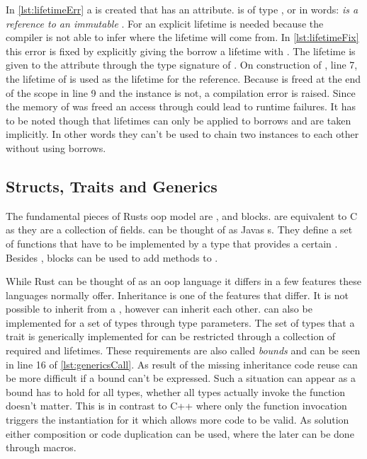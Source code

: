 \documentclass[thesis]{subfiles}
\begin{document}
    In \autoref{lst:lifetimeErr} a \struct \Foo is created that has an attribute.
     is of type , or in words: \emph{ is a reference to an immutable \String}.
    For  an explicit lifetime is needed because the compiler is not able to infer where the lifetime will come from.
    In \autoref{lst:lifetimeFix} this error is fixed by explicitly giving the borrow a lifetime with .
    The lifetime is given to the attribute through the type signature of \Foo.
    On construction of \Foo, line 7, the lifetime of  is used as the lifetime for the reference.
    Because  is freed at the end of the scope in line 9 and the \Foo instance is not, a compilation error is raised.
    Since the memory of  was freed an access through  could lead to runtime failures.
    It has to be noted though that lifetimes can only be applied to borrows and are taken implicitly.
    In other words they can't be used to chain two instances to each other without using borrows\autocite[PhantomData]{rust-doc}.

  \subsection{Structs, Traits and Generics}\label{sec:stg}
    The fundamental pieces of Rusts \gls{oop} model are \structs, \traits and  blocks.
    \structs are equivalent to C \structs as they are a collection of fields.
    \traits can be thought of as Javas s.
    They define a set of functions that have to be implemented by a type that provides a certain \trait.
    Besides \traits,  blocks can be used to add methods to \structs.

    While Rust can be thought of as an \gls{oop} language it differs in a few features these languages normally offer.
    Inheritance is one of the features that differ.
    It is not possible to inherit from a \struct, \traits however can inherit each other.
    \traits can also be implemented for a set of types through type parameters.
    The set of types that a trait is generically implemented for can be restricted through a collection of required \traits and lifetimes.
    These requirements are also called \emph{bounds} and can be seen in line 16 of \autoref{lst:genericsCall}.
    As result of the missing inheritance code reuse can be more difficult if a bound can't be expressed.
    Such a situation can appear as a bound has to hold for all types, whether all types actually invoke the function doesn't matter.
    This is in contrast to C++ where only the function invocation triggers the instantiation for it\autocite[§17.8.1 10]{cpp-iso} which allows more code to be valid.
    As solution either composition or code duplication can be used, where the later can be done through macros.
    \autocite[10. Generic Types, Traits, and Lifetimes, 17. Object Oriented Programming Features of Rust]{rust-book}
\end{document}
